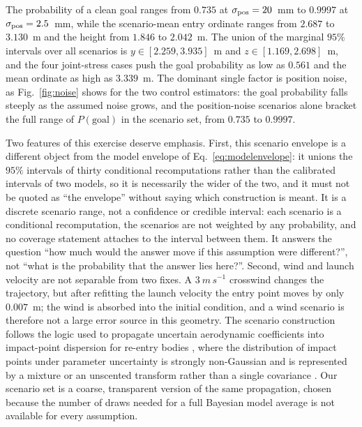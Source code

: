 The probability of a clean goal ranges from $0.735$ at
$\sigma_{\rm pos}=20$~mm to $0.9997$ at $\sigma_{\rm pos}=2.5$~mm, while the
scenario-mean entry ordinate ranges from $2.687$ to $3.130$~m and the height from
$1.846$ to $2.042$~m. The union of the marginal $95\%$ intervals over all
scenarios is $y\in[2.259,3.935]$~m and $z\in[1.169,2.698]$~m, and the four
joint-stress cases push the goal probability as low as $0.561$ and the mean
ordinate as high as $3.339$~m. The dominant single factor is position noise, as
Fig.~\ref{fig:noise} shows for the two control estimators: the goal probability
falls steeply as the assumed noise grows, and the position-noise scenarios
alone bracket the full range of $P(\text{goal})$ in the scenario set, from
$0.735$ to $0.9997$.

Two features of this exercise deserve emphasis. First, this scenario envelope is
a different object from the model envelope of Eq.~\eqref{eq:modelenvelope}: it
unions the $95\%$ intervals of thirty conditional recomputations rather than the
calibrated intervals of two models, so it is necessarily the wider of the two,
and it must not be quoted as ``the envelope'' without saying which construction
is meant. It is a discrete scenario range, not a confidence or credible
interval: each scenario is a
conditional recomputation, the scenarios are not weighted by any probability, and
no coverage statement attaches to the interval between them. It answers the
question ``how much would the answer move if this assumption were different?'',
not ``what is the probability that the answer lies here?''. Second, wind and
launch velocity are not separable from two fixes. A $3~\si{m\,s^{-1}}$ crosswind
changes the trajectory, but after refitting the launch velocity the entry point
moves by only $0.007$~m; the wind is absorbed into the initial condition, and a
wind scenario is therefore not a large error source in this geometry. The
scenario construction follows the logic used to propagate uncertain aerodynamic
coefficients into impact-point dispersion for re-entry bodies
\citep{mehta2015}, where the distribution of impact points under parameter
uncertainty is strongly non-Gaussian and is represented by a mixture or an
unscented transform rather than a single covariance \citep{williamson2017}. Our
scenario set is a coarse, transparent version of the same propagation, chosen
because the number of draws needed for a full Bayesian model average is not
available for every assumption.

